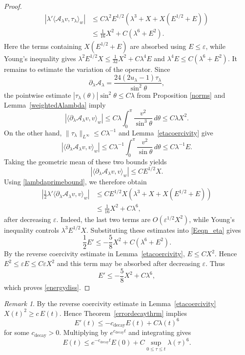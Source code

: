 \documentclass[11pt,a4paper]{article}
\numberwithin{equation}{section}
\theoremstyle{plain}
\theoremstyle{remark}
\newtheorem{remark}[theorem]{Remark}
\begin{document}
\begin{proof}
\begin{equation*}
\begin{aligned}
\left|
\lambda'\langle\mathcal A_\lambda v,\tau_\lambda\rangle_w
\right|
&\leq
C\lambda^2E^{1/2}
\left(
\lambda^3+X+X(E^{1/2}+E)
\right)\\
&\leq
\frac1{16}X^2+C(\lambda^6+E^2).
\end{aligned}
\end{equation*}
Here the terms containing $X(E^{1/2}+E)$ are absorbed using
$E\leq\varepsilon$, while Young's inequality gives
$\lambda^2E^{1/2}X\leq \frac1{32}X^2+C\lambda^4E$ and
$\lambda^4E\leq C(\lambda^6+E^2)$.
It remains to estimate the variation of the operator. Since
$$
\partial_\lambda\mathcal A_\lambda
=
\frac{24(2u_\lambda-1)\tau_\lambda}{\sin^2\theta},
$$
the pointwise estimate $|\tau_\lambda(\theta)|\sin^2\theta\leq C\lambda$ from Proposition \ref{norms} and Lemma~\ref{weightedAlambda} imply
$$
\left|
\langle\partial_\lambda\mathcal A_\lambda v,v\rangle_w
\right|
\leq
C\lambda
\int_0^\pi\frac{v^2}{\sin^3\theta}\,d\theta
\leq
C\lambda X^2.
$$
On the other hand, $\|\tau_\lambda\|_{L^\infty}\leq C\lambda^{-1}$
and Lemma~\ref{etacoercivity} give
$$
\left|
\langle\partial_\lambda\mathcal A_\lambda v,v\rangle_w
\right|
\leq
C\lambda^{-1}
\int_0^\pi\frac{v^2}{\sin\theta}\,d\theta
\leq
C\lambda^{-1}E.
$$
Taking the geometric mean of these two bounds yields
$$
\left|
\langle\partial_\lambda\mathcal A_\lambda v,v\rangle_w
\right|
\leq
CE^{1/2}X.
$$
Using \eqref{lambdaprimebound}, we therefore obtain
\begin{equation*}
\begin{aligned}
\left|
\frac12\lambda'
\langle\partial_\lambda\mathcal A_\lambda v,v\rangle_w
\right|
&\leq
CE^{1/2}X
\left(
\lambda^3+X+X(E^{1/2}+E)
\right)\\
&\leq
\frac1{16}X^2+C\lambda^6,
\end{aligned}
\end{equation*}
after decreasing $\varepsilon$. Indeed, the last two terms are
$O(\varepsilon^{1/2}X^2)$, while Young's inequality controls
$\lambda^3E^{1/2}X$.
Substituting these estimates into \eqref{Eeqn_eta} gives
$$
\frac12E'
\leq
-\frac{5}{8}X^2+C(\lambda^6+E^2).
$$
By the reverse coercivity estimate in
Lemma~\ref{etacoercivity}, $E\leq CX^2$. Hence $E^2\leq\varepsilon E\leq C\varepsilon X^2$ and this term may be absorbed after decreasing $\varepsilon$.
Thus
$$
E'\leq-\frac{5}{8}X^2+C\lambda^6,
$$
which proves \eqref{energydiss}.
\end{proof}
\begin{remark}\label{energydecayremark}
By the reverse coercivity estimate in Lemma~\ref{etacoercivity} $X(t)^2\geq c\,E(t)$. Hence Theorem~\ref{errordecaythrm} implies
$$
E'(t)\leq-c_{\mathrm{decay}} E(t)+C\lambda(t)^6
$$
for some $c_{\mathrm{decay}}>0$. Multiplying by $e^{c_{\mathrm{decay}} t}$ and integrating gives
\begin{equation}\label{Edecay}
E(t)
\leq
e^{-c_{\mathrm{decay}} t}E(0)
+
C\sup_{0\leq \tau\leq t}\lambda(\tau)^6.
\end{equation}
\end{remark}
\end{document}
